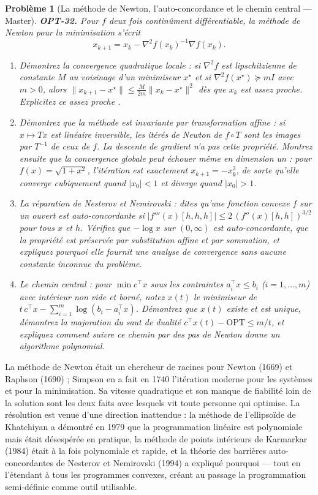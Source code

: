 \documentclass[11pt]{article}
\newtheorem{problem}{Problème}
\begin{document}
\begin{problem}[{La méthode de Newton, l'auto-concordance et le chemin central --- Master}]
\textbf{OPT-32.} Pour $f$ deux fois continûment différentiable, la méthode de Newton pour la
minimisation s'écrit
\[ x_{k+1} = x_k - \nabla^2 f(x_k)^{-1} \nabla f(x_k). \]
\begin{enumerate}
\item[(a)] Démontrez la convergence quadratique locale : si $\nabla^2 f$ est lipschitzienne de constante
$M$ au voisinage d'un minimiseur $x^\star$ et si $\nabla^2 f(x^\star) \succeq m I$ avec
$m >0$, alors $\|x_{k+1} - x^\star\| \le \frac{M}{2m}\|x_k - x^\star\|^2$ dès que $x_k$ est
assez proche. Explicitez ce \og{} assez proche \fg{}.
\item[(b)] Démontrez que la méthode est invariante par transformation affine : si $x \mapsto Tx$ est
linéaire inversible, les itérés de Newton de $f \circ T$ sont les images par $T^{-1}$ de ceux de
$f$. La descente de gradient n'a pas cette propriété. Montrez ensuite que la convergence globale
peut échouer même en dimension un : pour $f(x) = \sqrt{1 + x^2}$, l'itération est exactement
$x_{k+1} = -x_k^3$, de sorte qu'elle converge cubiquement quand $|x_0| <1$ et diverge quand
$|x_0| >1$.
\item[(c)] La réparation de Nesterov et Nemirovski : dites qu'une fonction convexe $f$ sur un ouvert est
\textit{auto-concordante} si $|f'''(x)[h,h,h]| \le 2\,(f''(x)[h,h])^{3/2}$ pour tous $x$ et
$h$. Vérifiez que $-\log x$ sur $(0, \infty)$ est auto-concordante, que la propriété est
préservée par substitution affine et par sommation, et expliquez pourquoi elle fournit une analyse
de convergence sans aucune constante inconnue du problème.
\item[(d)] Le chemin central : pour $\min c^{\top}x$ sous les contraintes $a_i^{\top} x \le b_i$
($i = 1,\dots,m$) avec intérieur non vide et borné, notez $x(t)$ le minimiseur de
$t\,c^{\top}x - \sum_{i=1}^m \log(b_i - a_i^{\top}x)$. Démontrez que $x(t)$ existe et est unique,
démontrez la majoration du saut de dualité $c^{\top}x(t) - \mathrm{OPT} \le m/t$, et expliquez
comment suivre ce chemin par des pas de Newton donne un algorithme polynomial.
\end{enumerate}

\end{problem}

\noindent La méthode de Newton était un chercheur de racines pour Newton (1669) et Raphson
(1690) ; Simpson en a fait en 1740 l'itération moderne pour les systèmes et pour la minimisation.
Sa vitesse quadratique et son manque de fiabilité loin de la solution sont les deux faits avec
lesquels vit toute personne qui optimise. La résolution est venue d'une direction inattendue : la
méthode de l'ellipsoïde de Khatchiyan a démontré en 1979 que la programmation linéaire est
polynomiale mais était désespérée en pratique, la méthode de points intérieurs de Karmarkar (1984)
était à la fois polynomiale et rapide, et la théorie des barrières auto-concordantes de Nesterov et
Nemirovski (1994) a expliqué pourquoi --- tout en l'étendant à tous les programmes convexes, créant au
passage la programmation semi-définie comme outil utilisable.
\end{document}

